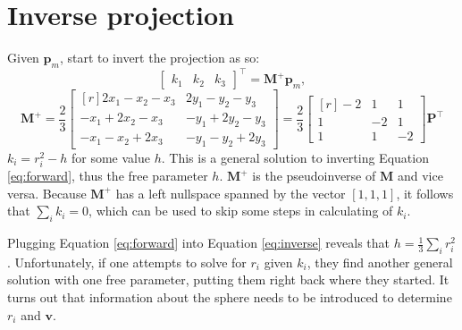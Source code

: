 \documentclass[]{interact}
\begin{document}
\section{Inverse projection}
Given $\mathbf p_m$, start to invert the projection as so:
\begin{equation}\label{eq:inverse}
\begin{bmatrix*} k_1 & k_2 & k_3

\end{bmatrix*}^\top = \mathbf M^+ \mathbf p_m,
\end{equation}
\begin{equation}\label{eq:inversem}
\mathbf M^+ = \frac{2}{3}
\begin{bmatrix*}[r] 2x_1 - x_2 - x_3 & 2y_1 - y_2 - y_3 \\
-x_1 + 2x_2 - x_3 & -y_1 + 2y_2 - y_3 \\
-x_1 - x_2 + 2x_3 & -y_1 - y_2 + 2y_3
\end{bmatrix*} = \frac{2}{3}
\begin{bmatrix*}[r] -2 & 1 & 1 \\
1 & -2 & 1 \\
1 & 1 & -2
\end{bmatrix*}
\mathbf P^\top
\end{equation}
$k_i = r^2_i - h$ for some value $h$. This is a general solution to inverting
Equation \ref{eq:forward}, thus the free parameter $h$. $\mathbf M^+$ is the
pseudoinverse of $\mathbf M$ and vice versa. Because $\mathbf M^+$ has a left
nullspace spanned by the vector $[1, 1, 1]$, it follows that $\sum_i k_i = 0$,
which can be used to skip some steps in calculating of $k_i$.

Plugging Equation \ref{eq:forward} into Equation \ref{eq:inverse} reveals that
$h = \frac{1}{3}\sum_i r^2_i$. Unfortunately, if one attempts to solve for
$r_i$ given $k_i$, they find another general solution with one free parameter,
putting them right back where they started. It turns out that information about
the sphere needs to be introduced to determine $r_i$ and $\mathbf v$.

\end{document}
